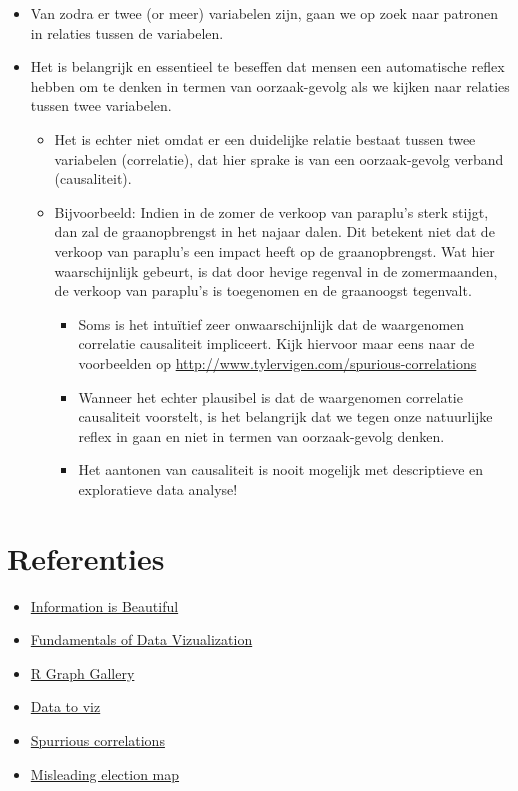 \documentclass[]{tufte-book}
\providecommand{\tightlist}{%
  \setlength{\itemsep}{0pt}\setlength{\parskip}{0pt}}
\begin{document}
\begin{itemize}
\tightlist
\item
  Van zodra er twee (or meer) variabelen zijn, gaan we op zoek naar patronen in relaties tussen de variabelen.
\item
  Het is belangrijk en essentieel te beseffen dat mensen een automatische reflex hebben om te denken in termen van oorzaak-gevolg als we kijken naar relaties tussen twee variabelen.

  \begin{itemize}
  \tightlist
  \item
    Het is echter niet omdat er een duidelijke relatie bestaat tussen twee variabelen (correlatie), dat hier sprake is van een oorzaak-gevolg verband (causaliteit).
  \item
    Bijvoorbeeld: Indien in de zomer de verkoop van paraplu's sterk stijgt, dan zal de graanopbrengst in het najaar dalen. Dit betekent niet dat de verkoop van paraplu's een impact heeft op de graanopbrengst. Wat hier waarschijnlijk gebeurt, is dat door hevige regenval in de zomermaanden, de verkoop van paraplu's is toegenomen en de graanoogst tegenvalt.

    \begin{itemize}
    \tightlist
    \item
      Soms is het intuïtief zeer onwaarschijnlijk dat de waargenomen correlatie causaliteit impliceert. Kijk hiervoor maar eens naar de voorbeelden op \url{http://www.tylervigen.com/spurious-correlations}
    \item
      Wanneer het echter plausibel is dat de waargenomen correlatie causaliteit voorstelt, is het belangrijk dat we tegen onze natuurlijke reflex in gaan en niet in termen van oorzaak-gevolg denken.
    \item
      Het aantonen van causaliteit is nooit mogelijk met descriptieve en exploratieve data analyse!
    \end{itemize}
  \end{itemize}
\end{itemize}

\hypertarget{referenties-1}{%
\section{Referenties}\label{referenties-1}}

\begin{itemize}
\tightlist
\item
  \href{https://informationisbeautiful.net/}{Information is Beautiful}
\item
  \href{https://serialmentor.com/dataviz/}{Fundamentals of Data Vizualization}
\item
  \href{https://www.r-graph-gallery.com/}{R Graph Gallery}
\item
  \href{https://www.data-to-viz.com/}{Data to viz}
\item
  \href{https://www.tylervigen.com/spurious-correlations}{Spurrious correlations}
\item
  \href{https://edition.cnn.com/2020/01/17/politics/donald-trump-2016-map-county-by-county/index.html}{Misleading election map}
\end{itemize}


\end{document}
